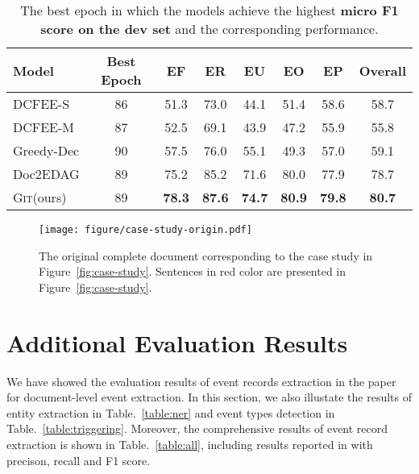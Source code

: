 \documentclass[11pt,a4paper]{article}
\newcommand{\modelname}{\textsc{Git}\xspace}
\begin{document}
\begin{table*}[htbp]
\centering
\begin{tabular}{lccccccc}
\hline
\bf Model & \bf Best Epoch & \bf EF & \bf ER & \bf EU & \bf EO & \bf EP & \bf Overall \\
\hline
DCFEE-S  & 86 & 51.3 & 73.0 & 44.1 & 51.4 & 58.6 & 58.7 \\
DCFEE-M  & 87 & 52.5 & 69.1 & 43.9 & 47.2 & 55.9 & 55.8 \\
Greedy-Dec  & 90 & 57.5 & 76.0 & 55.1 & 49.3 & 57.0 & 59.1 \\
Doc2EDAG  & 89 & 75.2 & 85.2 & 71.6 & 80.0 & 77.9 & 78.7 \\
\hline
\modelname (ours) & 89 & \bf 78.3 & \bf 87.6 & \bf 74.7 & \bf 80.9 & \bf 79.8 & \bf 80.7 \\
\hline
\end{tabular}
\caption{The best epoch in which the models achieve the highest \textbf{micro F1 score on the dev set} and the corresponding performance.
}
\label{table:dev}
\end{table*}

\begin{figure*}[h]
    \centering
    \texttt{[image: figure/case-study-origin.pdf]}
    \caption{The original complete document corresponding to the case study in Figure~\ref{fig:case-study}. Sentences in red color are presented in Figure~\ref{fig:case-study}.}
    \label{fig:case-study-origin}
\end{figure*}


\section{Additional Evaluation Results}
\label{appendix-evaluation}
We have showed the evaluation results of event records extraction in the paper for document-level event extraction.
In this section, we also illustate the results of entity extraction in Table.~\ref{table:ner} and event types detection in Table.~\ref{table:triggering}.
Moreover, the comprehensive results of event record extraction is shown in Table.~\ref{table:all}, including results reported in \citet{zheng-etal-2019-doc2edag} with precison, recall and F1 score.
\end{document}
